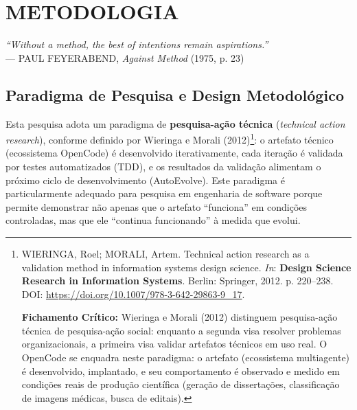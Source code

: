 
\chapter{METODOLOGIA}
\label{ch:metodologia}

\begin{flushright}
\small\textit{``Without a method, the best of intentions remain aspirations.''}\\
--- PAUL FEYERABEND, \textit{Against Method} (1975, p. 23)
\end{flushright}

\section{Paradigma de Pesquisa e Design Metodológico}

Esta pesquisa adota um paradigma de \textbf{pesquisa-ação técnica} (\textit{technical action research}), conforme definido por Wieringa e Morali (2012)\footnote{
  WIERINGA, Roel; MORALI, Artem. Technical action research as a validation method in information systems design science. \textit{In}: \textbf{Design Science Research in Information Systems}. Berlin: Springer, 2012. p. 220--238. DOI: \url{https://doi.org/10.1007/978-3-642-29863-9_17}.

  \textbf{Fichamento Crítico:} Wieringa e Morali (2012) distinguem pesquisa-ação técnica de pesquisa-ação social: enquanto a segunda visa resolver problemas organizacionais, a primeira visa validar artefatos técnicos em uso real. O OpenCode se enquadra neste paradigma: o artefato (ecossistema multiagente) é desenvolvido, implantado, e seu comportamento é observado e medido em condições reais de produção científica (geração de dissertações, classificação de imagens médicas, busca de editais).
}: o artefato técnico (ecossistema OpenCode) é desenvolvido iterativamente, cada iteração é validada por testes automatizados (TDD), e os resultados da validação alimentam o próximo ciclo de desenvolvimento (AutoEvolve). Este paradigma é particularmente adequado para pesquisa em engenharia de software porque permite demonstrar não apenas que o artefato ``funciona'' em condições controladas, mas que ele ``continua funcionando'' à medida que evolui.

